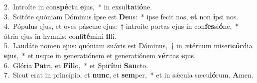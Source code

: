 {2.~}Introíte in con\textbf{spé}ctu \textbf{e}jus,~* in exsul\textbf{ta}ti\textbf{ó}ne.\\
{3.~}Scitóte quóniam Dóminus \textbf{i}pse est \textbf{De}us:~* ipse fecit nos, \textbf{et} non \textbf{i}psi nos.\\
{4.~}Pópulus ejus, et oves páscuæ ejus:~† introíte portas ejus in con\textbf{fes}si\textbf{ó}ne,~* átria ejus in hymnis: confi\textbf{té}mini \textbf{il}li.\\
{5.~}Laudáte nomen ejus: quóniam suávis est Dóminus,~† in ætérnum miseri\textbf{cór}dia \textbf{e}jus,~* et usque in generatiónem et generatiónem \textbf{vé}ritas \textbf{e}jus.\\
{6.~}Glória \textbf{Pa}tri, et \textbf{Fí}\textbf{li}o,~* et Spi\textbf{rí}tui \textbf{San}cto.\\
{7.~}Sicut erat in princípio, et \textbf{nunc}, et \textbf{sem}per,~* et in sǽcula sæcu\textbf{ló}rum. \textbf{A}men.\\
